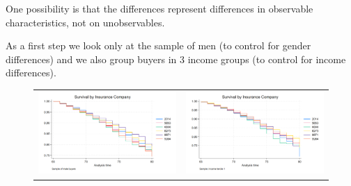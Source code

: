 \documentclass[12pt]{article}
\begin{document}
One possibility is that the differences represent differences in observable characteristics, not on unobservables. 

As a first step we look only at the sample of men (to control for gender differences) and we also group buyers in 3 income groups (to control for income differences). 


\begin{figure}[H]
\caption{}
\label{fig:ie6_3}
\centering{}%
\begin{tabular}{cc}
\includegraphics[scale=0.25]{../figures/IE6/IE6_survival_year_males.png} & \includegraphics[scale=0.25]{../figures/IE6/IE6_survival_year_income1.png} 
\end{tabular}
\end{figure}
\end{document}
